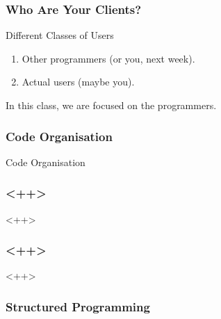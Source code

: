 \begin{frame}[fragile]
\frametitle{Who Are Your Clients?}
\begin{block}{Different Classes of Users}
\begin{enumerate}
\item Other programmers (or you, next week).
\item Actual users (maybe you).
\end{enumerate}
\end{block}

In this class, we are focused on the programmers.
\end{frame}





\begin{frame}[fragile]
\frametitle{Code Organisation}

\begin{block}{Code Organisation}

\end{block}
\end{frame}




\begin{frame}[fragile]
\frametitle{<++>}
<++>
\end{frame}



\begin{frame}[fragile]
\frametitle{<++>}
<++>
\end{frame}


\begin{frame}[fragile]
\frametitle{Structured Programming}
\end{frame}

